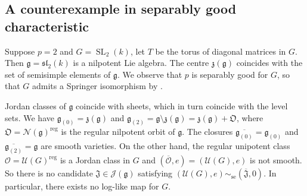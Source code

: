 \documentclass[12pt]{amsart}
\theoremstyle{definition}
\theoremstyle{remark}
\newcommand{\g}{\mathfrak{g}}
\renewcommand{\sl}{\mathfrak{sl}}
\newcommand{\z}{\mathfrak{z}}
\newcommand{\J}{\mathfrak{J}}
\newcommand{\orb}{\mathfrak{O}}
\newcommand{\N}{\mathcal{N}}
\renewcommand{\O}{\mathcal{O}}
\newcommand{\U}{\mathcal{U}}
\newcommand{\reg}{{\operatorname{reg}}}
\newcommand{\SL}{\operatorname{SL}}
\newcommand{\se}{\operatorname{se}}
\begin{document}
\subsection{A counterexample in separably good characteristic} \label{ss_sep}
Suppose $p = 2$ and $G = \SL_2(k)$, let $T$ be the torus  of diagonal matrices in $G$.
Then $\g = \sl_2(k)$ is a nilpotent Lie algebra.
The centre $\z(\g)$ coincides with the set of semisimple elements of $\g$.
We observe that $p$ is separably good for $G$, so that $G$ admits a Springer isomorphism by \cite{Springer_unipotent}. 

Jordan classes of $\g$ coincide with sheets, which in turn coincide with the level sets.
We have
$\g_{(0)} = \z(\g)$  and $\g_{(2)} = \g \setminus \z(\g) = \z(\g) + \orb$, where $\orb = \N(\g)^\reg$ is the regular nilpotent orbit of $\g$.
The closures $\overline{\g_{(0)}} = \g_{(0)}$ and $\overline{\g_{(2)}} = \g$ are smooth varieties.
On the other hand, the regular unipotent class $\O = \U(G)^\reg$ is a Jordan class in $G$ and $(\overline{\O}, e) = (\U(G), e)$ is not smooth.
So there is no  candidate $\J \in \mathcal{J}(\g)$ satisfying  $(\U(G) , e) \sim_{\se} (\overline{\J}, 0)$.
In particular, there exists no log-like map for $G$.







\end{document}
